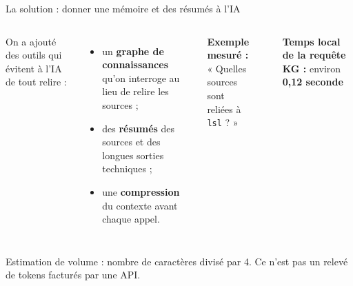 \documentclass[aspectratio=169,11pt]{beamer}
\begin{document}
\begin{frame}{La solution : donner une mémoire et des résumés à l'IA}
\footnotesize
\begin{columns}
On a ajouté des outils qui évitent à l'IA de tout relire :
\begin{itemize}
    \item un \textbf{graphe de connaissances} qu'on interroge au lieu de relire les sources ;
    \item des \textbf{résumés} des sources et des longues sorties techniques ;
    \item une \textbf{compression} du contexte avant chaque appel.
\end{itemize}
\vspace{0.1cm}
\textbf{Exemple mesuré :}\\
« Quelles sources sont reliées à \texttt{lsl} ? »

\centering
{}
\\[-0.05cm]
\colorbox{mygreen!12}{\parbox{0.88\linewidth}{\centering
\textbf{Temps local de la requête KG :} environ \textbf{0,12 seconde}}}
\end{columns}
\vspace{0.05cm}

{\tiny\textcolor{mygray}{Estimation de volume : nombre de caractères
divisé par 4. Ce n'est pas un relevé de tokens facturés par une API.}}
\end{frame}

\end{document}
